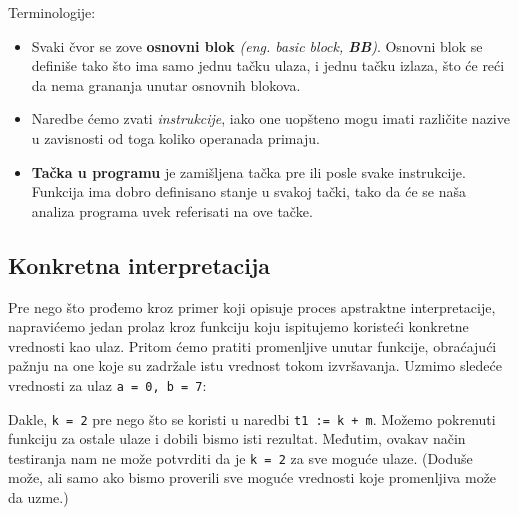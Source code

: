 Terminologije:
\begin{itemize}
\item Svaki čvor se zove \textbf{osnovni blok} \emph{(eng. basic block, \textbf{BB})}.
Osnovni blok se definiše tako što ima samo jednu tačku ulaza, i jednu tačku izlaza,
što će reći da nema grananja unutar osnovnih blokova.
\item Naredbe ćemo zvati \emph{instrukcije}, iako one uopšteno mogu imati
različite nazive u zavisnosti od toga koliko operanada primaju.
\item \textbf{Tačka u programu} je zamišljena tačka pre ili posle svake instrukcije.
Funkcija ima dobro definisano stanje u svakoj tački, tako da će se naša analiza
programa uvek referisati na ove tačke.
\end{itemize}


\subsection{Konkretna interpretacija}
\label{subsec:concreteimpr}
Pre nego što prođemo kroz primer koji opisuje proces apstraktne interpretacije,
napravićemo jedan prolaz kroz funkciju koju ispitujemo koristeći konkretne vrednosti
kao ulaz. Pritom ćemo pratiti promenljive unutar funkcije, obraćajući pažnju na
one koje su zadržale istu vrednost tokom izvršavanja. Uzmimo sledeće vrednosti za ulaz
\texttt{a = 0, b = 7}:
 
Dakle, \texttt{k = 2} pre nego što se koristi u naredbi \texttt{t1 := k + m}.
Možemo pokrenuti funkciju za ostale ulaze i dobili bismo isti rezultat.
Međutim, ovakav način testiranja nam ne može potvrditi da je \texttt{k = 2} za
sve moguće ulaze. (Doduše može, ali samo ako bismo proverili sve moguće vrednosti
koje promenljiva može da uzme.)


